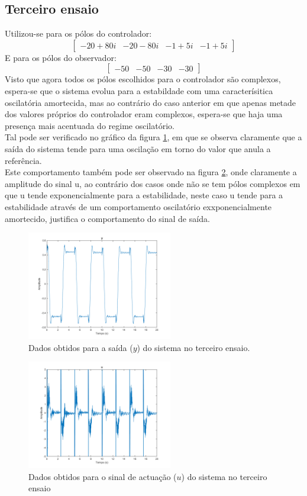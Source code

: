 \documentclass[%
  reprint,
  nofootinbib,
  amsmath,amssymb,
  aps,
  10pt,
  a4paper
]{revtex4-1}
\begin{document}
\subsection{Terceiro ensaio}
Utilizou-se para os pólos do controlador:
\begin{equation}
\begin{bmatrix}
-20+80i & -20-80i  & -1+5i &-1+5i
\end{bmatrix}
\end{equation}
E para os pólos do observador:
\begin{equation}
\begin{bmatrix}
-50 & -50  & -30 &-30
\end{bmatrix}
\end{equation}
Visto que agora todos os pólos escolhidos para o controlador são complexos, espera-se que o sistema evolua para a estabildade com uma caracterísitica oscilatória amortecida, mas  ao contrário do caso anterior em que apenas metade dos valores próprios do controlador eram complexos, espera-se que haja uma presença mais acentuada do regime oscilatório.\\
Tal pode ser verificado no gráfico da figura \ref{fig:y_e}, em que se observa claramente que a saída do sistema tende para uma oscilação em torno do valor que anula a referência.\\
Este comportamento também pode ser observado na figura \ref{fig:u_e}, onde claramente a amplitude do sinal u, ao contrário dos casos onde não se tem pólos complexos em que u tende exponencialmente para a estabilidade, neste caso u tende para a estabilidade através de um comportamento oscilatório exxponencialmente amortecido, justifica o comportamento do sinal de saída.
\begin{figure}
\includegraphics[width=2.5in]{../imgs/dados_00_e/dados_00_e_y.png}
\caption{Dados obtidos para a saída ($y$) do sistema no terceiro ensaio.}
\label{fig:y_e}
\end{figure}
\begin{figure}
\includegraphics[width=2.5in]{../imgs/dados_00_e/dados_00_e_u.png}
\caption{Dados obtidos para o sinal de actuação ($u$) do sistema no terceiro ensaio}
\label{fig:u_e}
\end{figure}
\end{document}
